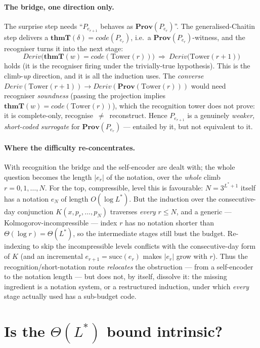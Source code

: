 \documentclass[11pt]{article}
\theoremstyle{plain}
\theoremstyle{definition}
\theoremstyle{remark}
\newcommand{\code}[1]{\mathit{code}(#1)}
\newcommand{\thmT}{\mathbf{thmT}}
\newcommand{\Prov}{\mathbf{Prov}}
\newcommand{\Deriv}{\mathit{Deriv}}
\newcommand{\Lstar}{L^{*}}
\begin{document}
\paragraph{The bridge, one direction only.}
The surprise step needs ``$P_{e_{r+1}}$ behaves as $\Prov(P_{e_r})$''. The
generalised-Chaitin step delivers a $\thmT(\delta)=\code{P_{e_r}}$, i.e.\ a
$\Prov(P_{e_r})$-witness, and the recogniser turns it into the next stage:
\[
  \Deriv\bigl(\thmT(w)=\code{\mathrm{Tower}(r)}\bigr)\ \Longrightarrow\ \Deriv\bigl(\mathrm{Tower}(r{+}1)\bigr)
\]
holds (it is the recogniser firing under the trivially-true hypothesis). This is
the climb-\emph{up} direction, and it is all the induction uses. The
\emph{converse} $\Deriv(\mathrm{Tower}(r{+}1))\to\Deriv(\Prov(\mathrm{Tower}(r)))$
would need recogniser \emph{soundness} (passing the projection implies
$\thmT(w)=\code{\mathrm{Tower}(r)}$), which the recognition tower does not prove:
it is complete-only, recognise~$\neq$~reconstruct. Hence $P_{e_{r+1}}$ is a
genuinely \emph{weaker, short-coded surrogate} for $\Prov(P_{e_r})$ --- entailed
by it, but not equivalent to it.

\paragraph{Where the difficulty re-concentrates.}
With recognition the bridge and the self-encoder are dealt with; the whole
question becomes the length $|e_r|$ of the notation, over the \emph{whole} climb
$r=0,1,\dots,N$. For the top, compressible, level this is favourable:
$N=3^{\Lstar+1}$ itself has a notation $e_N$ of length $O(\log\Lstar)$. But the
induction over the consecutive-day conjunction $K(x,p_r,\dots,p_N)$ traverses
\emph{every} $r\le N$, and a generic --- Kolmogorov-incompressible --- index $r$
has no notation shorter than $\Theta(\log r)=\Theta(\Lstar)$, so the intermediate
stages still bust the budget. Re-indexing to skip the incompressible levels
conflicts with the consecutive-day form of $K$ (and an incremental $e_{r+1}=\mathrm{succ}(e_r)$
makes $|e_r|$ grow with $r$). Thus the recognition/short-notation route
\emph{relocates} the obstruction --- from a self-encoder to the notation length
--- but does not, by itself, dissolve it: the missing ingredient is a notation
system, or a restructured induction, under which \emph{every} stage actually
used has a sub-budget code.

\section{Is the $\Theta(\Lstar)$ bound intrinsic?}
\end{document}
